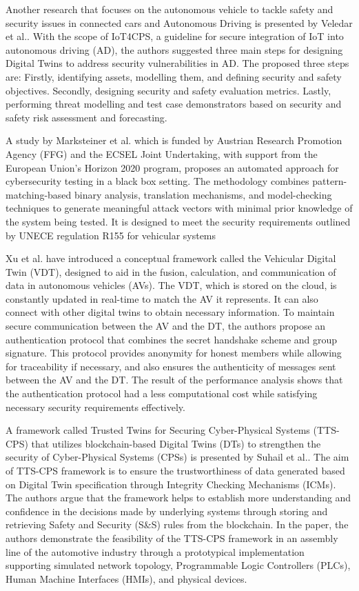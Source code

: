 Another research that focuses on the autonomous vehicle to tackle safety and security issues in connected cars and Autonomous Driving is presented by Veledar et al.\cite{veledarDigitalTwinsDependability2019}.
With the scope of IoT4CPS, a guideline for secure integration of IoT into autonomous driving (AD), the authors suggested three main steps for designing Digital Twins to address security vulnerabilities in AD. The proposed three steps are: Firstly, identifying assets, modelling them, and defining security and safety objectives. Secondly, designing security and safety evaluation metrics. Lastly, performing threat modelling and test case demonstrators based on security and safety risk assessment and forecasting.

A study by Marksteiner et al. \cite{marksteinerUsingCyberDigital2021} which is funded by Austrian Research Promotion Agency (FFG) and the ECSEL Joint Undertaking, with support from the European Union's Horizon 2020 program, proposes an automated approach for cybersecurity testing in a black box setting. The methodology combines pattern-matching-based binary analysis, translation mechanisms, and model-checking techniques to generate meaningful attack vectors with minimal prior knowledge of the system being tested. It is designed to meet the security requirements outlined by UNECE regulation R155 for vehicular systems  

Xu et al.\cite{xuEfficientAuthenticationVehicular2021} have introduced a conceptual framework called the Vehicular Digital Twin (VDT), designed to aid in the fusion, calculation, and communication of data in autonomous vehicles (AVs). The VDT, which is stored on the cloud, is constantly updated in real-time to match the AV it represents. It can also connect with other digital twins to obtain necessary information. To maintain secure communication between the AV and the DT, the authors propose an authentication protocol that combines the secret handshake scheme and group signature. This protocol provides anonymity for honest members while allowing for traceability if necessary, and also ensures the authenticity of messages sent between the AV and the DT. The result of the performance analysis shows that the authentication protocol had a less computational cost while satisfying necessary security requirements effectively. 

A framework called Trusted Twins for Securing Cyber-Physical Systems (TTS-CPS) that utilizes blockchain-based Digital Twins (DTs) to strengthen the security of Cyber-Physical Systems (CPSs) is presented by Suhail et al.\cite{suhailSituationalAwareCyberphysical2022}. The aim of TTS-CPS framework is to ensure the trustworthiness of data generated based on Digital Twin specification through Integrity Checking Mechanisms (ICMs). The authors argue that the framework helps to establish more understanding and confidence in the decisions made by underlying systems through storing and retrieving Safety and Security (S\&S) rules from the blockchain. In the paper, the authors demonstrate the feasibility of the TTS-CPS framework in an assembly line of the automotive industry through a prototypical implementation supporting simulated network topology, Programmable Logic Controllers (PLCs), Human Machine Interfaces (HMIs), and physical devices. 


